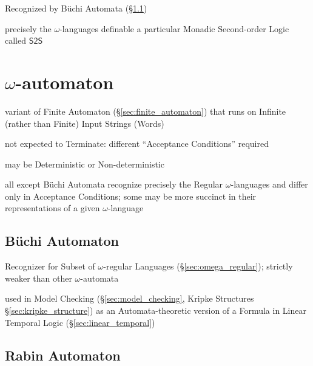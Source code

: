 Recognized by B\"uchi Automata (\S\ref{sec:buchi_automaton})

precisely the $\omega$-languages definable a particular Monadic
Second-order Logic called $\mathsf{S2S}$



\section{$\omega$-automaton}\label{sec:omega_automaton}

variant of Finite Automaton (\S\ref{sec:finite_automaton}) that runs
on Infinite (rather than Finite) Input Strings (Words)

not expected to Terminate: different ``Acceptance Conditions''
required %

may be Deterministic or Non-deterministic

all except B\"uchi Automata recognize precisely the Regular
$\omega$-languages and differ only in Acceptance Conditions; some may
be more succinct in their representations of a given $\omega$-language



\subsection{B\"uchi Automaton}\label{sec:buchi_automaton}

Recognizer for Subset of $\omega$-regular Languages
(\S\ref{sec:omega_regular}); strictly weaker than other
$\omega$-automata

used in Model Checking (\S\ref{sec:model_checking}, Kripke Structures
\S\ref{sec:kripke_structure}) as an Automata-theoretic version of a
Formula in Linear Temporal Logic (\S\ref{sec:linear_temporal})



\subsection{Rabin Automaton}\label{sec:rabin_automaton}

